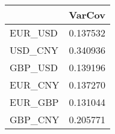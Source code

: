 \begin{tabular}{lr}
\toprule
{} &    VarCov \\
\midrule
EUR\_USD &  0.137532 \\
USD\_CNY &  0.340936 \\
GBP\_USD &  0.139196 \\
EUR\_CNY &  0.137270 \\
EUR\_GBP &  0.131044 \\
GBP\_CNY &  0.205771 \\
\bottomrule
\end{tabular}
